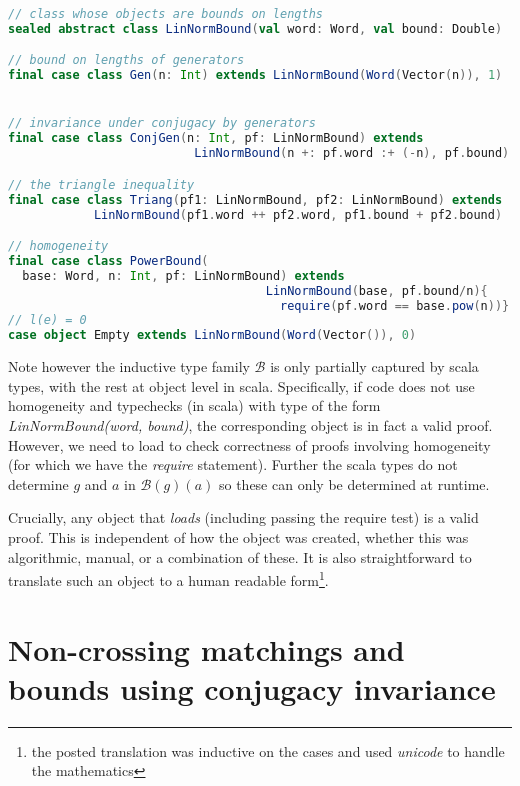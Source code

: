 \documentclass{amsart}
\theoremstyle{plain}
\theoremstyle{definition}
\theoremstyle{remark}
\newcommand{\B}{\mathcal{B}}
\begin{document}
\begin{lstlisting}[language=scala, caption=scala code for bounds, label=L:Bound, basicstyle=\footnotesize,   stringstyle=\color{codepurple}]
// class whose objects are bounds on lengths
sealed abstract class LinNormBound(val word: Word, val bound: Double)

// bound on lengths of generators
final case class Gen(n: Int) extends LinNormBound(Word(Vector(n)), 1)


// invariance under conjugacy by generators
final case class ConjGen(n: Int, pf: LinNormBound) extends
                          LinNormBound(n +: pf.word :+ (-n), pf.bound)

// the triangle inequality
final case class Triang(pf1: LinNormBound, pf2: LinNormBound) extends
            LinNormBound(pf1.word ++ pf2.word, pf1.bound + pf2.bound)

// homogeneity
final case class PowerBound(
  base: Word, n: Int, pf: LinNormBound) extends
                                    LinNormBound(base, pf.bound/n){
                                      require(pf.word == base.pow(n))}
// l(e) = 0
case object Empty extends LinNormBound(Word(Vector()), 0)
\end{lstlisting}

Note however the inductive type family $\B$ is only partially captured by scala types, with the rest at object level in scala. Specifically, if code does not use homogeneity and typechecks (in scala) with type of the form \emph{LinNormBound(word, bound)}, the corresponding object is in fact a valid proof. However, we need to load to check correctness of proofs involving homogeneity (for which we have the \emph{require} statement). Further the scala types do not determine $g$ and $a$ in $\B(g)(a)$ so these can only be determined at runtime.

Crucially, any object that \emph{loads} (including passing the require test) is a valid proof. This is independent of how the object was created, whether this was algorithmic, manual, or a combination of these. It is also straightforward to translate such an object to a human readable form\footnote{the posted translation was inductive on the cases and used \emph{unicode} to handle the mathematics}.


\section{Non-crossing matchings and bounds using conjugacy invariance}\label{S:noncross}
\end{document}
